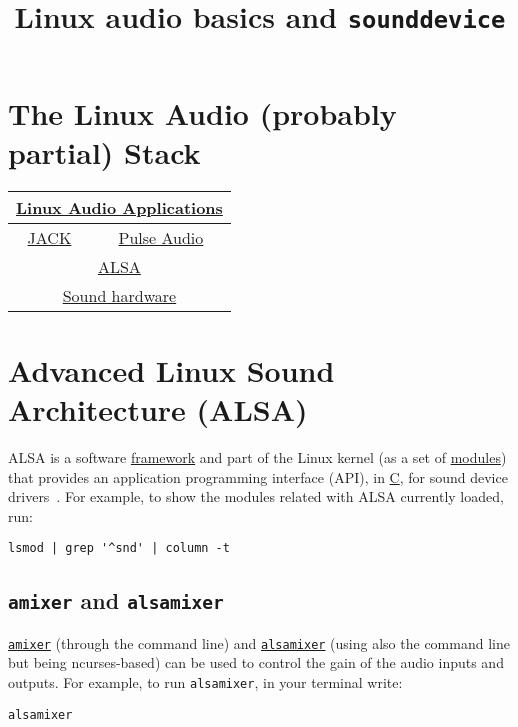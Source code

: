
\title{Linux audio basics and \texttt{sounddevice}}

\maketitle

\section{The Linux Audio (probably partial) Stack}

\begin{center}
\begin{tabular}{|c|c|}
\hline
\multicolumn{2}{c}{\href{https://en.wikipedia.org/wiki/List\_of\_Linux\_audio\_software}{Linux Audio Applications}} \\
\hline
\href{https://jackaudio.org/}{JACK} & \href{https://www.freedesktop.org/wiki/Software/PulseAudio/}{Pulse Audio} \\
\hline
\multicolumn{2}{c}{\href{https://www.alsa-project.org}{ALSA}} \\
\hline
\multicolumn{2}{c}{\href{https://www.alsa-project.org/wiki/Matrix:Main}{Sound hardware}} \\
\hline
\end{tabular}
\end{center}

\section{Advanced Linux Sound Architecture (ALSA)}
ALSA is a software
\href{https://docs.kernel.org/sound/kernel-api/index.html}{framework}
and part of the Linux kernel (as a set of
\href{https://wiki.archlinux.org/title/Kernel_module}{modules}) that
provides an application programming interface (API), in
\href{https://en.wikipedia.org/wiki/C_(programming_language)}{C}, for
sound device drivers~\cite{phillips2005user}. For example, to show the
modules related with ALSA currently loaded, run:
\begin{verbatim}
lsmod | grep '^snd' | column -t
\end{verbatim}

\subsection{\texttt{amixer} and \texttt{alsamixer}}
\texttt{\href{https://linux.die.net/man/1/amixer}{amixer}} (through the command line) and \texttt{\href{https://en.wikipedia.org/wiki/Alsamixer}{alsamixer}} (using also the command line but being ncurses-based) can be used to control the gain of the audio inputs and outputs. For example, to run \texttt{alsamixer}, in your terminal write:
\begin{verbatim}
alsamixer
\end{verbatim}

